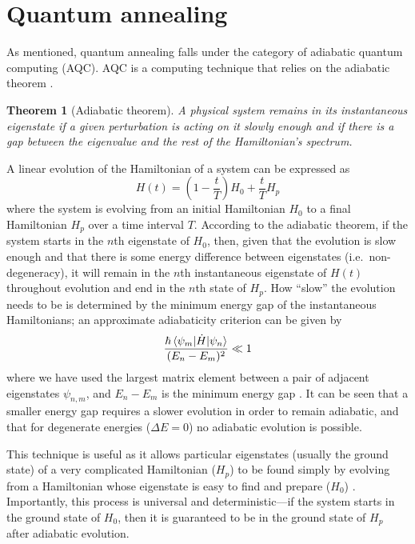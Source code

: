 \documentclass[12pt]{article}
\newtheorem*{theorem}{Theorem}
\theoremstyle{definition}
\begin{document}
\section{Quantum annealing}

As mentioned, quantum annealing falls under the category of adiabatic quantum computing (AQC). AQC is a computing technique that relies on the adiabatic theorem \cite{born_beweis_1928}.

\begin{theorem}[Adiabatic theorem]
    A physical system remains in its instantaneous eigenstate if a given perturbation is acting on it slowly enough and if there is a gap between the eigenvalue and the rest of the Hamiltonian's spectrum.
    \label{thm:adiabatic}
\end{theorem}

A linear evolution of the Hamiltonian of a system can be expressed as
\begin{equation}
    H(t)=\left(1- \frac{t}{T}\right)H_0 + \frac{t}{T}H_p
    \label{eq:time-evolution}
\end{equation}
where the system is evolving from an initial Hamiltonian $H_0$ to a final Hamiltonian $H_p$ over a time interval $T$. According to the adiabatic theorem, if the system starts in the $n$th eigenstate of $H_0$, then, given that the evolution is slow enough and that there is some energy difference between eigenstates (i.e.\ non-degeneracy), it will remain in the $n$th instantaneous eigenstate of $H(t)$ throughout evolution and end in the $n$th state of $H_p$. How ``slow'' the evolution needs to be is determined by the minimum energy gap of the instantaneous Hamiltonians; an approximate adiabaticity criterion can be given by
\begin{equation}
    \frac{\hbar\braket{\psi_m|\dot{H}|\psi_n}}{(E_n-E_m)^2} \ll 1
    \label{eq:energy-gap}
\end{equation}
where we have used the largest matrix element between a pair of adjacent eigenstates $\psi_{n,m}$, and ${E_n-E_m}$ is the minimum energy gap \cite{sakurai_quantum_2020}. It can be seen that a smaller energy gap requires a slower evolution in order to remain adiabatic, and that for degenerate energies ($\Delta E=0$) no adiabatic evolution is possible. 

This technique is useful as it allows particular eigenstates (usually the ground state) of a very complicated Hamiltonian ($H_p$) to be found simply by evolving from a Hamiltonian whose eigenstate is easy to find and prepare ($H_0$) \cite{farhi_quantum_2001}. Importantly, this process is universal and deterministic---if the system starts in the ground state of $H_0$, then it is guaranteed to be in the ground state of $H_p$ after adiabatic evolution.
\end{document}

